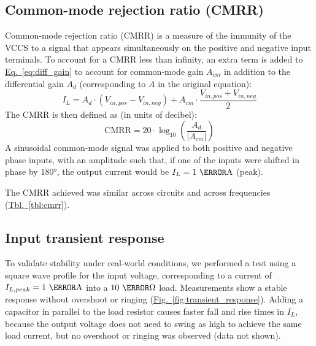 \documentclass[10pt]{article}
\newcommand{\brieftbllink}[1]{\hyperref[#1]{Tbl.~\ref*{#1}}\xspace }
\newcommand{\briefeqlink}[1]{\hyperref[#1]{Eq.~\ref*{#1}}\xspace }
\newcommand{\brieffiglink}[1]{\hyperref[#1]{Fig.~\ref*{#1}}}
\begin{document}
\subsection{Common-mode rejection ratio (CMRR)}

Common-mode rejection ratio (CMRR) is a measure of the immunity of the VCCS to a signal that appears simultaneously on the positive and negative input terminals. %
To account for a CMRR less than infinity, an extra term is added to \briefeqlink{eq:diff_gain} to account for common-mode gain $A_{cm}$ in addition to the differential gain $A_d$ (corresponding to $A$ in the original equation):
\begin{equation}
I_L = A_d\cdot(V_{in,pos} - V_{in,neg}) + A_{cm}\cdot \frac{V_{in,pos} + V_{in,neg}}{2}
\end{equation}
The CMRR is then defined as (in units of decibel):
\begin{equation}
\text{CMRR} = 20\cdot\log_{10}\left(\frac{A_d}{|A_{cm}|}\right)
\end{equation}
A sinusoidal common-mode signal was applied to both positive and negative phase inputs, with an amplitude such that, if one of the inputs were shifted in phase by $\ang{180}$, the output current would be $I_L=1~\milli\ampere$ (peak).

The CMRR achieved was similar across circuits and across frequencies (\brieftbllink{tbl:cmrr}).




\subsection{Input transient response}

To validate stability under real-world conditions, we performed a test using a square wave profile for the input voltage, corresponding to a current of $I_{L,peak}=1~\milli\ampere$ into a $10~\kilo\ohm$ load. Measurements show a stable response without overshoot or ringing (\brieffiglink{fig:transient_response}). Adding a capacitor in parallel to the load resistor causes faster fall and rise times in $I_L$, because the output voltage does not need to swing as high to achieve the same load current, but no overshoot or ringing was observed (data not shown).
\end{document}
